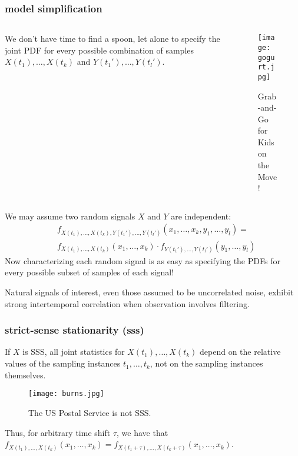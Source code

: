 \documentclass{beamer}
\begin{document}
\begin{frame}
	\frametitle{model simplification}
	\begin{columns}[T]
	\begin{column}{0.6\textwidth}
        	We don't have time to find a spoon, let alone to specify the joint PDF for every possible combination of samples $X(t_1),\ldots,X(t_k)$ and $Y(t_1'),\ldots,Y(t_l')$.
	\end{column}
	\begin{column}{0.3\textwidth}
		\vspace{-1.4cm}
		\begin{figure}
		\hfil\begin{minipage}{\textwidth}\centering
			\texttt{[image: gogurt.jpg]}
  			\caption{\scriptsize Grab-and-Go for Kids on the Move!}
			\end{minipage}
		\end{figure}
	\end{column}
	\end{columns}
	We may assume two random signals $X$ and $Y$ are independent:
	\vspace{-0.2cm}
	\begin{align*}
		&f_{X(t_1),\ldots,X(t_k),Y(t_1'),\ldots,Y(t_l')}(x_1,\ldots,x_k,y_1,\ldots,y_l) = \\& f_{X(t_1),\ldots,X(t_k)}(x_1,\ldots,x_k) \cdot f_{Y(t_1'),\ldots,Y(t_l')}(y_1,\ldots,y_l)
	\end{align*}
	\vspace{-0.1cm}Now characterizing each random signal is as easy as specifying the PDFs for every possible subset of samples of each signal! 
	
	\vspace{0.3cm}

	Natural signals of interest, even those assumed to be uncorrelated noise, exhibit strong intertemporal correlation when observation involves filtering.
\end{frame}

\begin{frame}[fragile]
	\frametitle{strict-sense stationarity (sss)}
	If $X$ is SSS, all joint statistics for $X(t_1), \ldots, X(t_k)$
depend on the relative values of the sampling instances $t_1, \ldots, t_k$, not on the sampling instances themselves.
	
        \begin{center}
		\begin{figure}
        \texttt{[image: burns.jpg]}
			\caption{The US Postal Service is not SSS.}
		\end{figure}
		\end{center}

			Thus, for arbitrary time shift $\tau$, we have that $f_{X(t_1), \ldots, X(t_k)}(x_1, \ldots, x_k) = f_{X(t_1+\tau),\ldots,X(t_k+\tau)}(x_1, \ldots, x_k)$.
\end{frame}
\end{document}

